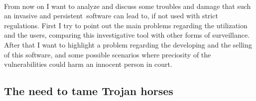 \paragraph{}
From now on I want to analyze and discuss some troubles and damage that such an invasive and persistent software can lead to, if not used with strict regulations. First I try to point out the main problems regarding the utilization and the users, comparing this investigative tool with other forms of surveillance. After that I want to highlight a problem regarding the developing and the selling of this software, and some possible scenarios where preciosity of the vulnerabilities could harm an innocent person in court.

\subsection*{The need to tame Trojan horses}
